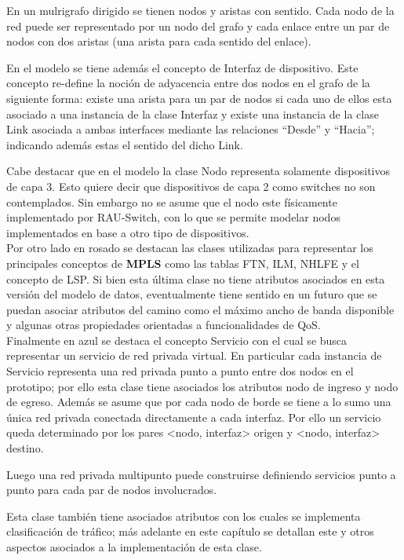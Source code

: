 \newpage
En un mulrigrafo dirigido se tienen nodos y aristas con sentido. Cada nodo de la red puede ser representado por un nodo del grafo y cada enlace entre un par de nodos con dos aristas (una arista para cada sentido del enlace).

En el modelo se tiene adem\'as el concepto de Interfaz de dispositivo. Este concepto re-define la noción de adyacencia entre dos nodos en el grafo de la siguiente forma: existe una arista para un par de nodos si cada uno de ellos esta asociado a una instancia de la clase Interfaz y existe una instancia de la clase Link asociada a ambas interfaces mediante las relaciones “Desde” y “Hacia”; indicando adem\'as estas el sentido del dicho Link.

Cabe destacar que en el modelo la clase Nodo representa solamente dispositivos de capa 3. Esto quiere decir que dispositivos de capa 2 como switches no son contemplados. Sin embargo no se asume que el nodo este f\'isicamente implementado por RAU-Switch, con lo que se permite modelar nodos implementados en base a otro tipo de dispositivos.\\

Por otro lado en rosado se destacan las clases utilizadas para representar los principales conceptos de \textbf{MPLS} como las tablas FTN, ILM, NHLFE y el concepto de LSP. Si bien esta \'ultima clase no tiene atributos asociados en esta versi\'on del modelo de datos, eventualmente tiene sentido en un futuro que se puedan asociar atributos del camino como el m\'aximo ancho de banda disponible y algunas otras propiedades orientadas a funcionalidades de QoS.\\

Finalmente en azul se destaca el concepto Servicio con el cual se busca representar un servicio de red privada virtual. En particular cada instancia de Servicio representa una red privada punto a punto entre dos nodos en el prototipo; por ello esta clase tiene asociados los atributos nodo de ingreso y nodo de egreso. Adem\'as se asume que por cada nodo de borde se tiene a lo sumo una \'unica red privada conectada directamente a cada interfaz. Por ello un servicio queda determinado por los pares <nodo, interfaz> origen y <nodo, interfaz> destino. 

Luego una red privada multipunto puede construirse definiendo servicios punto a punto para cada par de nodos involucrados.

Esta clase también tiene asociados atributos con los cuales se implementa clasificaci\'on de tr\'afico; m\'as adelante en este cap\'itulo se detallan este y otros aspectos asociados a la implementaci\'on de esta clase.\\

